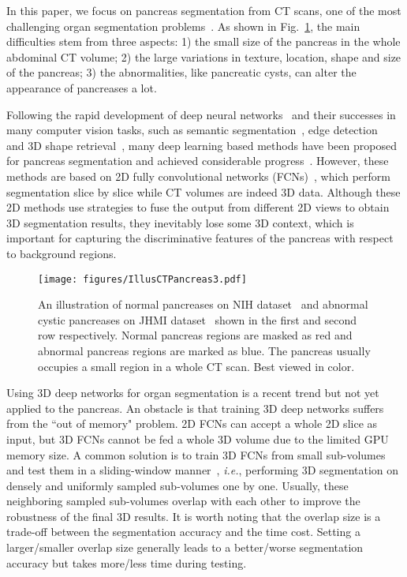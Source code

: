 \documentclass[10pt,twocolumn,letterpaper]{article}
\begin{document}
In this paper, we focus on pancreas segmentation from CT scans, one of the most challenging organ segmentation problems~\cite{zhou2017fixed}\cite{roth2015deeporgan}. As shown in Fig.~\ref{fig:CTPancreas}, the main difficulties stem from three aspects: 1) the small size of the pancreas in the whole abdominal CT volume; 2) the large variations in texture, location, shape and size of the pancreas;  3) the abnormalities, like pancreatic cysts, can alter the appearance of pancreases a lot.


Following the rapid development of deep neural networks~\cite{KrizhevskySH12}\cite{SimonyanZ14a} and their successes in many computer vision tasks, such as semantic segmentation~\cite{LongSD15}\cite{ChenPKMY17}, edge detection~\cite{ShenWWBZ15}\cite{XieT15}\cite{ShenWJWY17} and 3D shape retrieval~\cite{zhu2016deep}\cite{fang20153d}, many deep learning based methods have been proposed for pancreas segmentation and achieved considerable progress~\cite{zhou2017fixed}\cite{roth2015deeporgan}\cite{roth2016spatial}. However, these methods are based on 2D fully convolutional networks (FCNs)~\cite{LongSD15}, which perform segmentation slice by slice while CT volumes are indeed 3D data. Although these 2D methods use strategies to fuse the output from different 2D views to obtain 3D segmentation results, they inevitably lose some 3D context, which is important for capturing the discriminative features of the pancreas with respect to background regions.

\begin{figure}[t]
\centering
\texttt{[image: figures/IllusCTPancreas3.pdf]}\\
   \caption{An illustration of normal pancreases on NIH dataset~\cite{roth2015deeporgan} and abnormal cystic pancreases on JHMI dataset~\cite{zhou2017deep} shown in the first and second row respectively. Normal pancreas regions are masked as red and abnormal pancreas regions are marked as blue. The pancreas usually occupies a small region in a whole CT scan. Best viewed in color.}
\label{fig:CTPancreas}
\end{figure}

Using 3D deep networks for organ segmentation is a recent trend but not yet applied to the pancreas.
An obstacle is that training 3D deep networks suffers from the ``out of memory" problem. 2D FCNs can accept a whole 2D slice as input, but 3D FCNs cannot be fed a whole 3D volume due to the limited GPU memory size. A common solution is to train 3D FCNs from small sub-volumes and test them in a sliding-window manner~\cite{milletari2016v}\cite{bui20173d}\cite{cciccek20163d}\cite{chen2017voxresnet}\cite{yu2017automatic}, \emph{i.e.}, performing 3D segmentation on densely and uniformly sampled sub-volumes one by one. Usually, these neighboring sampled sub-volumes overlap with each other to improve the robustness of the final 3D results. It is worth noting that the overlap size is a trade-off between the segmentation accuracy and the time cost. Setting a larger/smaller overlap size generally leads to a better/worse segmentation accuracy but takes more/less time during testing.
\end{document}

